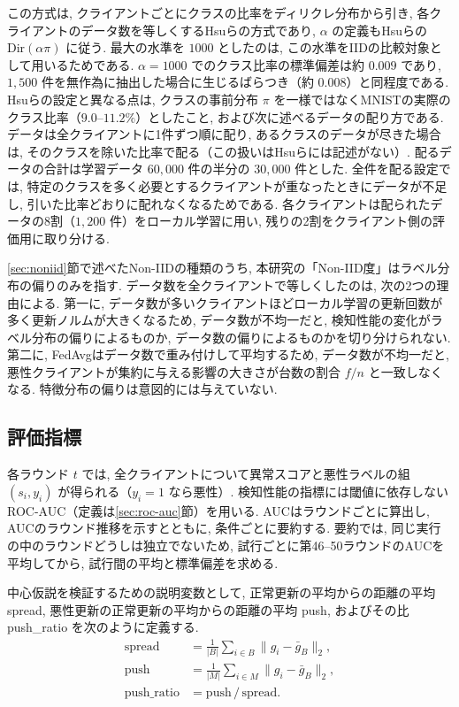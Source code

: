 \documentclass[a4j, twocolumn, dvipdfmx]{jsarticle}
\newcommand{\PushRatio}{\textrm{push\_ratio}}
\newcommand{\Spread}{\textrm{spread}}
\newcommand{\Push}{\textrm{push}}
\begin{document}
この方式は, クライアントごとにクラスの比率をディリクレ分布から引き, 各クライアントのデータ数を等しくするHsuら\cite{hsu2019measuring}の方式であり, $\alpha$ の定義もHsuらの $\mathrm{Dir}(\alpha\pi)$ に従う. 最大の水準を $1000$ としたのは, この水準をIIDの比較対象として用いるためである. $\alpha=1000$ でのクラス比率の標準偏差は約 $0.009$ であり, $1{,}500$ 件を無作為に抽出した場合に生じるばらつき（約 $0.008$）と同程度である. Hsuらの設定と異なる点は, クラスの事前分布 $\pi$ を一様ではなくMNISTの実際のクラス比率（$9.0$--$11.2\%$）としたこと, および次に述べるデータの配り方である. データは全クライアントに1件ずつ順に配り, あるクラスのデータが尽きた場合は, そのクラスを除いた比率で配る（この扱いはHsuらには記述がない）. 配るデータの合計は学習データ $60{,}000$ 件の半分の $30{,}000$ 件とした. 全件を配る設定では, 特定のクラスを多く必要とするクライアントが重なったときにデータが不足し, 引いた比率どおりに配れなくなるためである. 各クライアントは配られたデータの8割（$1{,}200$ 件）をローカル学習に用い, 残りの2割をクライアント側の評価用に取り分ける.

\ref{sec:noniid}節で述べたNon-IIDの種類のうち, 本研究の「Non-IID度」はラベル分布の偏りのみを指す. データ数を全クライアントで等しくしたのは, 次の2つの理由による. 第一に, データ数が多いクライアントほどローカル学習の更新回数が多く更新ノルムが大きくなるため, データ数が不均一だと, 検知性能の変化がラベル分布の偏りによるものか, データ数の偏りによるものかを切り分けられない. 第二に, FedAvgはデータ数で重み付けして平均するため, データ数が不均一だと, 悪性クライアントが集約に与える影響の大きさが台数の割合 $f/n$ と一致しなくなる. 特徴分布の偏りは意図的には与えていない.

\subsection{評価指標}
\label{sec:metrics}

各ラウンド $t$ では, 全クライアントについて異常スコアと悪性ラベルの組 $(s_i, y_i)$ が得られる（$y_i = 1$ なら悪性）. 検知性能の指標には閾値に依存しないROC-AUC（定義は\ref{sec:roc-auc}節）を用いる. AUCはラウンドごとに算出し, AUCのラウンド推移を示すとともに, 条件ごとに要約する. 要約では, 同じ実行の中のラウンドどうしは独立でないため, 試行ごとに第46--50ラウンドのAUCを平均してから, 試行間の平均と標準偏差を求める.

中心仮説を検証するための説明変数として, 正常更新の平均からの距離の平均 \Spread{}, 悪性更新の正常更新の平均からの距離の平均 \Push{}, およびその比 \PushRatio{} を次のように定義する.
\begin{align*}
  \Spread &= \tfrac{1}{|B|}\textstyle\sum_{i \in B}\|g_i - \bar{g}_B\|_2, \\
  \Push   &= \tfrac{1}{|M|}\textstyle\sum_{i \in M}\|g_i - \bar{g}_B\|_2, \\
  \PushRatio &= \Push\,/\,\Spread.
\end{align*}
\end{document}
